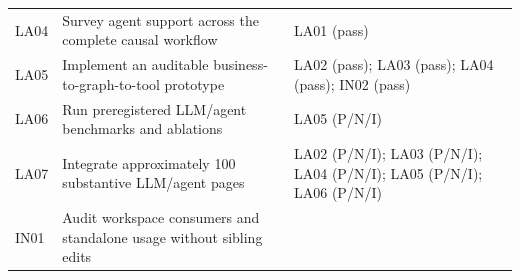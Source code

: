 \documentclass[
  11pt,
  a4paper,
]{article}
\begin{document}
\begin{longtable}[]{@{}lll@{}}
\begin{minipage}[t]{0.30\columnwidth}
LA04\strut
\end{minipage} & \begin{minipage}[t]{0.30\columnwidth}\raggedright
Survey agent support across the complete causal workflow\strut
\end{minipage} & \begin{minipage}[t]{0.30\columnwidth}\raggedright
LA01 (pass)\strut
\end{minipage}\tabularnewline
\begin{minipage}[t]{0.30\columnwidth}\raggedright
LA05\strut
\end{minipage} & \begin{minipage}[t]{0.30\columnwidth}\raggedright
Implement an auditable business-to-graph-to-tool prototype\strut
\end{minipage} & \begin{minipage}[t]{0.30\columnwidth}\raggedright
LA02 (pass); LA03 (pass); LA04 (pass); IN02 (pass)\strut
\end{minipage}\tabularnewline
\begin{minipage}[t]{0.30\columnwidth}\raggedright
LA06\strut
\end{minipage} & \begin{minipage}[t]{0.30\columnwidth}\raggedright
Run preregistered LLM/agent benchmarks and ablations\strut
\end{minipage} & \begin{minipage}[t]{0.30\columnwidth}\raggedright
LA05 (P/N/I)\strut
\end{minipage}\tabularnewline
\begin{minipage}[t]{0.30\columnwidth}\raggedright
LA07\strut
\end{minipage} & \begin{minipage}[t]{0.30\columnwidth}\raggedright
Integrate approximately 100 substantive LLM/agent pages\strut
\end{minipage} & \begin{minipage}[t]{0.30\columnwidth}\raggedright
LA02 (P/N/I); LA03 (P/N/I); LA04 (P/N/I); LA05 (P/N/I); LA06
(P/N/I)\strut
\end{minipage}\tabularnewline
\begin{minipage}[t]{0.30\columnwidth}\raggedright
IN01\strut
\end{minipage} & \begin{minipage}[t]{0.30\columnwidth}\raggedright
Audit workspace consumers and standalone usage without sibling
edits\strut
\end{minipage} & \begin{minipage}[t]{0.30\columnwidth}\raggedright

\end{minipage}
\end{longtable}
\end{document}
